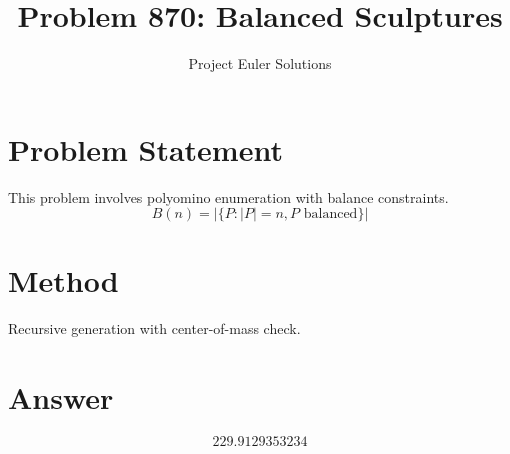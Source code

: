 \documentclass[11pt]{article}
\title{Problem 870: Balanced Sculptures}
\author{Project Euler Solutions}
\date{}
\begin{document}
\maketitle
\section{Problem Statement}
This problem involves polyomino enumeration with balance constraints.
\[
B(n) = |\{P : |P|=n, P \text{ balanced}\}|
\]
\section{Method}
Recursive generation with center-of-mass check.
\section{Answer}

\[
\boxed{229.9129353234}
\]
\end{document}
